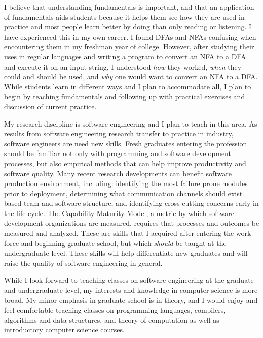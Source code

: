 \documentclass[10pt]{article}
\begin{document}
I believe that understanding fundamentals is important, and that an application
of fundamentals aids students because it helps them see how they are used in
practice and most people learn better by doing than only reading or listening.
I have experienced this in my own career.  I found DFAs and NFAs confusing when
encountering them in my freshman year of college.  However, after studying
their uses in regular languages and writing a program to convert an NFA to a
DFA and execute it on an input string, I understood \emph{how} they worked,
\emph{when} they could and should be used, and \emph{why} one would want to
convert an NFA to a DFA.  While students learn in different ways and I plan to
accommodate all, I plan to begin by teaching fundamentals and following up with
practical exercises and discussion of current practice.

My research discipline is software engineering and I plan to teach in this
area.  As results from software engineering research transfer to practice in
industry, software engineers are need new skills. Fresh graduates entering the
profession should be familiar not only with programming and software
development processes, but also empirical methods that can help improve
productivity and software quality.  Many recent research developments can
benefit software production environment, including: identifying the most
failure prone modules prior to deployment, determining what communication
channels should exist based team and software structure, and identifying
cross-cutting concerns early in the life-cycle.  The Capability Maturity Model,
a metric by which software development organizations are measured, requires
that processes and outcomes be measured and analyzed.  These are skills that I
acquired after entering the work force and beginning graduate school, but which
\emph{should} be taught at the undergraduate level.  These skills will help
differentiate new graduates and will raise the quality of software engineering
in general.

While I look forward to teaching classes on software engineering at the
graduate and undergraduate level, my interests and knowledge in computer
science is more broad.  My minor emphasis in graduate school is in theory, and I
would enjoy and feel comfortable teaching classes on programming languages,
compilers, algorithms and data structures, and theory of computation as well as
introductory computer science courses.
\end{document}
